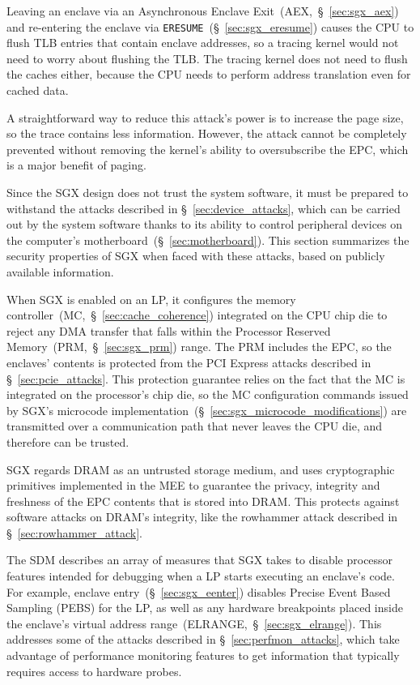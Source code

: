 Leaving an enclave via an Asynchronous Enclave Exit~(AEX,~\S~\ref{sec:sgx_aex})
and re-entering the enclave via \texttt{ERESUME}~(\S~\ref{sec:sgx_eresume})
causes the CPU to flush TLB entries that contain enclave addresses, so a
tracing kernel would not need to worry about flushing the TLB. The tracing
kernel does not need to flush the caches either, because the CPU needs to
perform address translation even for cached data.

A straightforward way to reduce this attack's power is to increase the page
size, so the trace contains less information. However, the attack cannot be
completely prevented without removing the kernel's ability to oversubscribe the
EPC, which is a major benefit of paging.


\label{sec:sgx_vs_device_attacks}

Since the SGX design does not trust the system software, it must be prepared to
withstand the attacks described in \S~\ref{sec:device_attacks}, which can be
carried out by the system software thanks to its ability to control peripheral
devices on the computer's motherboard~(\S~\ref{sec:motherboard}). This section
summarizes the security properties of SGX when faced with these attacks, based
on publicly available information.

When SGX is enabled on an LP, it configures the memory
controller~(MC,~\S~\ref{sec:cache_coherence}) integrated on the CPU chip die to
reject any DMA transfer that falls within the Processor Reserved
Memory~(PRM,~\S~\ref{sec:sgx_prm}) range. The PRM includes the EPC, so the
enclaves' contents is protected from the PCI Express attacks described in
\S~\ref{sec:pcie_attacks}. This protection guarantee relies on the fact that
the MC is integrated on the processor's chip die, so the MC configuration
commands issued by SGX's microcode
implementation~(\S~\ref{sec:sgx_microcode_modifications}) are transmitted over
a communication path that never leaves the CPU die, and therefore can be
trusted.

SGX regards DRAM as an untrusted storage medium, and uses cryptographic
primitives implemented in the MEE to guarantee the privacy, integrity and
freshness of the EPC contents that is stored into DRAM. This protects against
software attacks on DRAM's integrity, like the rowhammer attack described in
\S~\ref{sec:rowhammer_attack}.


The SDM describes an array of measures that SGX takes to disable processor
features intended for debugging when a LP starts executing an enclave's code.
For example, enclave entry~(\S~\ref{sec:sgx_eenter}) disables Precise Event
Based Sampling (PEBS) for the LP, as well as any hardware breakpoints placed
inside the enclave's virtual address range~(ELRANGE,~\S~\ref{sec:sgx_elrange}).
This addresses some of the attacks described in \S~\ref{sec:perfmon_attacks},
which take advantage of performance monitoring features to get information that
typically requires access to hardware probes.

